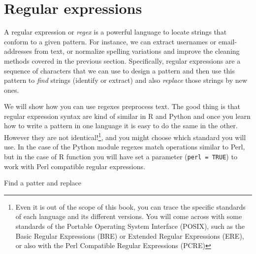 \section{Regular expressions}
\label{sec:regular}

A regular expression or \emph{regex} is a powerful language to locate strings that conform to a given pattern. For instance, we can extract usernames or email-addresses from text, or normalize spelling variations and improve the cleaning methods covered in the previous section. Specifically, regular expressions are a sequence of characters that we can use to design a pattern and then use this pattern to \emph{find} strings (identify or extract) and also \emph{replace} those strings by new ones. 

We will show how you can use regexes preprocess text. The good thing is that regular expression syntax are kind of similar in R and Python and once you learn how to write a pattern in one language it is easy to do the same in the other.  However they are not identical!\footnote{Even it is out of the scope of this book, you can trace the specific standards of each language and its different versions. You will come across with some standards of the Portable Operating System Interface (POSIX), such as the Basic Regular Expressions (BRE) or Extended Regular Expressions (ERE), or also with the Perl Compatible Regular Expressions (PCRE)}, and you might choose which standard you will use. In the case of the Python  module regexes match operations similar to Perl, but in the case of R  function you will have set a parameter (\verb|perl = TRUE|) to work with Perl compatible regular expressions.	


Find a patter and replace 